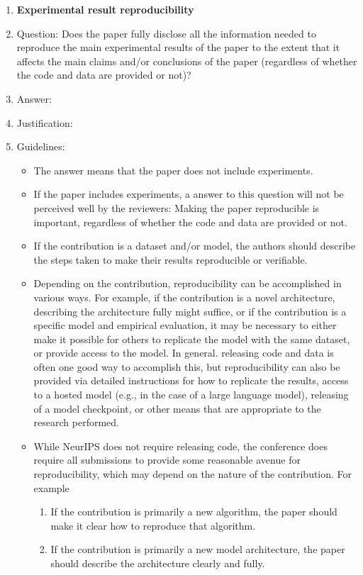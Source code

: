 \documentclass{article}
\theoremstyle{definition}
\begin{document}
\begin{enumerate}
    \item {\bf Experimental result reproducibility}
    \item[] Question: Does the paper fully disclose all the information needed to reproduce the main experimental results of the paper to the extent that it affects the main claims and/or conclusions of the paper (regardless of whether the code and data are provided or not)?
    \item[] Answer: \answerTODO{} \item[] Justification: \justificationTODO{}
    \item[] Guidelines:
    \begin{itemize}
        \item The answer \answerNA{} means that the paper does not include experiments.
        \item If the paper includes experiments, a \answerNo{} answer to this question will not be perceived well by the reviewers: Making the paper reproducible is important, regardless of whether the code and data are provided or not.
        \item If the contribution is a dataset and\slash or model, the authors should describe the steps taken to make their results reproducible or verifiable. 
        \item Depending on the contribution, reproducibility can be accomplished in various ways. For example, if the contribution is a novel architecture, describing the architecture fully might suffice, or if the contribution is a specific model and empirical evaluation, it may be necessary to either make it possible for others to replicate the model with the same dataset, or provide access to the model. In general. releasing code and data is often one good way to accomplish this, but reproducibility can also be provided via detailed instructions for how to replicate the results, access to a hosted model (e.g., in the case of a large language model), releasing of a model checkpoint, or other means that are appropriate to the research performed.
        \item While NeurIPS does not require releasing code, the conference does require all submissions to provide some reasonable avenue for reproducibility, which may depend on the nature of the contribution. For example
        \begin{enumerate}
            \item If the contribution is primarily a new algorithm, the paper should make it clear how to reproduce that algorithm.
            \item If the contribution is primarily a new model architecture, the paper should describe the architecture clearly and fully.

\end{enumerate}
\end{itemize}
\end{enumerate}
\end{document}
